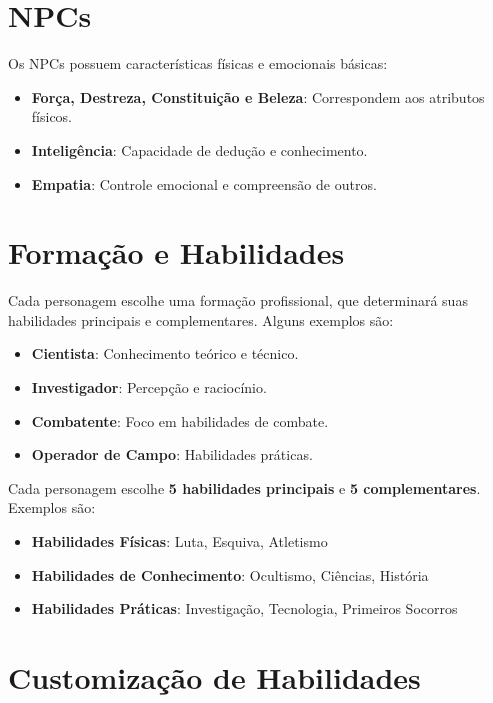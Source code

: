 \documentclass[a4paper,12pt]{book}
\begin{document}
\section{NPCs}

Os NPCs possuem características físicas e emocionais básicas:
\begin{itemize}
    \item \textbf{Força, Destreza, Constituição e Beleza}: Correspondem aos atributos físicos.
    \item \textbf{Inteligência}: Capacidade de dedução e conhecimento.
    \item \textbf{Empatia}: Controle emocional e compreensão de outros.
\end{itemize}

\section{Formação e Habilidades}

Cada personagem escolhe uma formação profissional, que determinará suas habilidades principais e complementares. Alguns exemplos são: 

\begin{itemize}
    \item \textbf{Cientista}: Conhecimento teórico e técnico.
    \item \textbf{Investigador}: Percepção e raciocínio.
    \item \textbf{Combatente}: Foco em habilidades de combate.
    \item \textbf{Operador de Campo}: Habilidades práticas.
\end{itemize}

Cada personagem escolhe \textbf{5 habilidades principais} e \textbf{5 complementares}. Exemplos são:

\begin{itemize}
    \item \textbf{Habilidades Físicas}: Luta, Esquiva, Atletismo
    \item \textbf{Habilidades de Conhecimento}: Ocultismo, Ciências, História
    \item \textbf{Habilidades Práticas}: Investigação, Tecnologia, Primeiros Socorros
\end{itemize}

\section{Customização de Habilidades}
\end{document}
